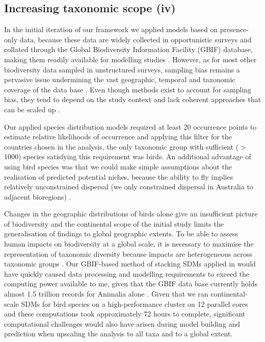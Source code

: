 \documentclass[titlesmallcaps,copyrightpage]{uomthesis}\usepackage[]{graphicx}\usepackage[]{color}
\begin{document}
\subsection{Increasing taxonomic scope (iv)}
In the initial iteration of our framework we applied models based on presence-only data, because these data are widely collected in opportunistic surveys and collated through the Global Biodiversity Information Facility (GBIF) database, making them readily available for modelling studies \citep{gbif_gbif_2016}. However, as for most other biodiversity data sampled in unstructured surveys, sampling bias remains a pervasive issue undermining the vast geographic, temporal and taxonomic coverage of the data base \citep{troia_filling_2016, kapitza_assessing_2021}. Even though methods exist to account for sampling bias, they tend to depend on the study context and lack coherent approaches that can be scaled up \citep{kramer-schadt_importance_2013, stolar_accounting_2015, kapitza_assessing_2021, fithian_bias_2015}.

Our applied species distribution models required at least 20 occurrence points to estimate relative likelihoods of occurrence and applying this filter for the countries chosen in the analysis, the only taxonomic group with sufficient (\(>\)1000) species satisfying this requirement was birds. An additional advantage of using bird species was that we could make simple assumptions about the realisation of predicted potential niches, because the ability to fly implies relatively unconstrained dispersal (we only constrained dispersal in Australia to adjacent bioregions) \citep{kapitza_assessing_2021}.

Changes in the geographic distributions of birds alone give an insufficient picture of biodiversity and the continental scope of the initial study limits the generalisation of findings to global geographic extents. To be able to assess human impacts on biodiversity at a global scale, it is necessary to maximise the representation of taxonomic diversity because impacts are heterogeneous across taxonomic groups \citep{hudson_predicts_2014}. Our GBIF-based method of stacking SDMs applied in  would have quickly caused data processing and modelling requirements to exceed the computing power available to me, given that the GBIF data base currently holds almost 1.5 trillion records for Animalia alone \citep{gbiforg_gbif_2021}. Given that we ran continental-scale SDMs for bird species on a high-performance cluster on 12 parallel cores and these computations took approximately 72 hours to complete, significant computational challenges would also have arisen during model building and prediction when upscaling the analysis to all taxa and to a global extent. 
\end{document}
